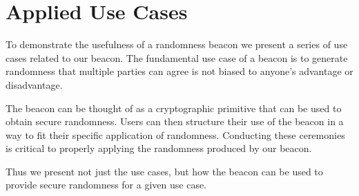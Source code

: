 \section{Applied Use Cases}
To demonstrate the usefulness of a randomness beacon we present a series of use cases related to our beacon.
The fundamental use case of a beacon is to generate randomness that multiple parties can agree is not biased to anyone's advantage or disadvantage.

The beacon can be thought of as a cryptographic primitive that can be used to obtain secure randomness. Users can then structure their use of the beacon in a way to fit their specific application of randomness. Conducting these ceremonies is critical to properly applying the randomness produced by our beacon.

Thus we present not just the use cases, but how the beacon can be used to provide secure randomness for a given use case.

